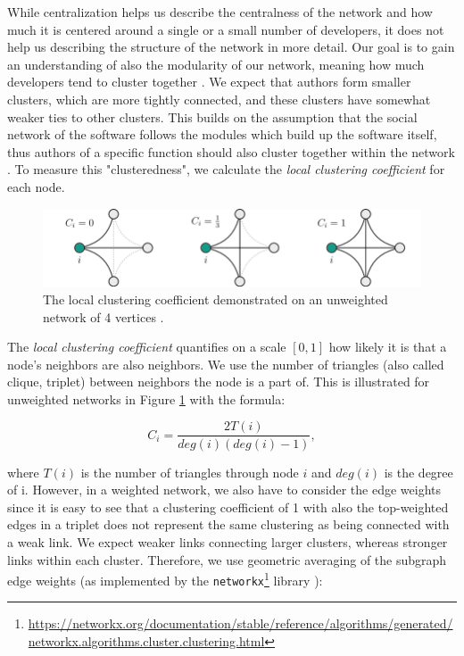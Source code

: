While centralization helps us describe the centralness of the network and how much it is centered around a single or a small number of developers, it does not help us describing the structure of the network in more detail. Our goal is to gain an understanding of also the modularity of our network, meaning how much developers tend to cluster together \cite{joblinEvolutionaryTrendsDeveloper2017}. We expect that authors form smaller clusters, which are more tightly connected, and these clusters have somewhat weaker ties to other clusters. This builds on the assumption that the social network of the software follows the modules which build up the software itself, thus authors of a specific function should also cluster together within the network \cite{conwayHowCommitteesInvent1968, joblinEvolutionaryTrendsDeveloper2017}. To measure this "clusteredness", we calculate the \textit{local clustering coefficient} for each node.

\begin{figure}
    \centering
    \includegraphics[width=1\textwidth]{figures/loc_clust_coeff.png}
    \caption{The local clustering coefficient demonstrated on an unweighted network of 4 vertices \cite{jedrzejewskiRoleComplexNetworks2016}.}
    \label{fig:loc clust coeff}
\end{figure}

The \textit{local clustering coefficient} quantifies on a scale $[0, 1]$ how likely it is that a node's neighbors are also neighbors. We use the number of triangles (also called clique, triplet) between neighbors the node is a part of. This is illustrated for unweighted networks in Figure \ref{fig:loc clust coeff} with the formula:

\[ C_i = \frac{2T(i)}{deg(i)(deg(i)-1)}, \]

where $T(i)$ is the number of triangles through node $i$ and $deg(i)$ is the degree of i. However, in a weighted network, we also have to consider the edge weights since it is easy to see that a clustering coefficient of 1 with also the top-weighted edges in a triplet does not represent the same clustering as being connected with a weak link. We expect weaker links connecting larger clusters, whereas stronger links within each cluster. Therefore, we use geometric averaging of the subgraph edge weights (as implemented by the \texttt{networkx}\footnote{\url{https://networkx.org/documentation/stable/reference/algorithms/generated/networkx.algorithms.cluster.clustering.html}} library \cite{onnelaIntensityCoherenceMotifs2005}):

